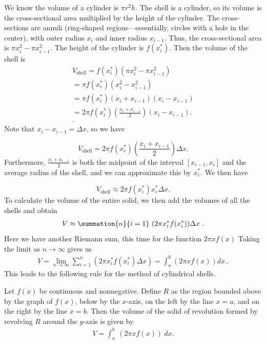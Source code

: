 \documentclass{report}
\begin{document}
    \pagebreak \bigbreak \noindent 
    We know the volume of a cylinder is $\pi r^{2}h $. 
    \bigbreak \noindent 
    The shell is a cylinder, so its volume is the cross-sectional area multiplied by the height of the cylinder. The cross-sections are annuli (ring-shaped regions---essentially, circles with a hole in the center), with outer radius \( x_i \) and inner radius \( x_{i-1} \). Thus, the cross-sectional area is \( \pi x_i^2 - \pi x_{i-1}^2 \). The height of the cylinder is \( f(x^*_i) \). Then the volume of the shell is
    \begin{align*}
    V_{\text{shell}} = f(x^*_i)(\pi x_i^2 - \pi x_{i-1}^2)  \\
    = \pi f(x^*_i)(x_i^2 - x_{i-1}^2)  \\
    = \pi f(x^*_i)(x_i + x_{i-1})(x_i - x_{i-1})  \\
    = 2\pi f(x^*_i)\left(\frac{x_i + x_{i-1}}{2}\right)(x_i - x_{i-1}). \\
    .\end{align*}
    Note that \( x_i - x_{i-1} = \Delta x \), so we have

    \[
    V_{\text{shell}} = 2\pi f(x^*_i)\left(\frac{x_i + x_{i-1}}{2}\right)\Delta x.
    \]
    Furthermore, \( \frac{x_i + x_{i-1}}{2} \) is both the midpoint of the interval \( [x_{i-1}, x_i] \) and the average radius of the shell, and we can approximate this by \( x^*_i \). We then have

    \[
    V_{\text{shell}} \approx 2\pi f(x^*_i) x^*_i \Delta x.
    \]
    \bigbreak \noindent 
    To calculate the volume of the entire solid, we then add the volumes of all the shells and obtain
    \begin{align*}
        V \approx \summation{n}{i=1}\ (2\pi x_{i}^{*}f(x_{i}^{*}))\Delta x\ 
    .\end{align*}
    Here we have another Riemann sum, this time for the function $2\pi xf(x) $ Taking the limit as  $n \rightarrow \infty $ gives us
  \begin{align*}
    V = \lim_{{n \to \infty}} \sum_{{i=1}}^{n} \left( 2\pi x^*_i f(x^*_i) \Delta x \right) = \int_{a}^{b} \left( 2\pi x f(x) \right) dx.
  .\end{align*}
  \bigbreak \noindent 
  This leads to the following rule for the method of cylindrical shells.
  \bigbreak \noindent \bigbreak \noindent 
  \begin{thrm}
      Let \( f(x) \) be continuous and nonnegative. Define \( R \) as the region bounded above by the graph of \( f(x) \), below by the \( x \)-axis, on the left by the line \( x = a \), and on the right by the line \( x = b \). Then the volume of the solid of revolution formed by revolving \( R \) around the \( y \)-axis is given by
      \begin{align*}
          V = \int_{a}^{b}\ (2\pi xf(x))\ dx
      .\end{align*}
  \end{thrm}
\end{document}
